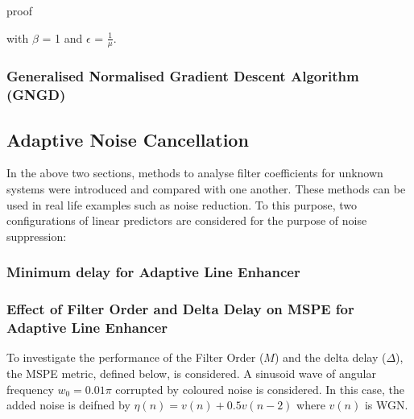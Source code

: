 \documentclass[main.tex]{subfiles}
\begin{document}
proof

with $\beta$ = 1 and $\epsilon$ = $\frac{1}{\mu}$.



\subsubsection{Generalised Normalised Gradient Descent Algorithm (GNGD)}





























\subsection{Adaptive Noise Cancellation}

In the above two sections, methods to analyse filter coefficients for unknown systems were introduced and compared with one another. These methods can be used in real life examples such as noise reduction.	To this purpose, two configurations of linear predictors are considered for the purpose of noise suppression:



\subsubsection{Minimum delay for Adaptive Line Enhancer}


\subsubsection{Effect of Filter Order and Delta Delay on MSPE for Adaptive Line Enhancer}

To investigate the performance of the Filter Order ($M$) and the delta delay ($\Delta$), the MSPE metric, defined below, is considered. A sinusoid wave of angular frequency $w_0 = 0.01\pi$ corrupted by coloured noise is considered. In this case, the added noise is deifned by $\eta(n) = v(n) + 0.5v(n-2)$ where $v(n)$ is WGN. 
\end{document}
